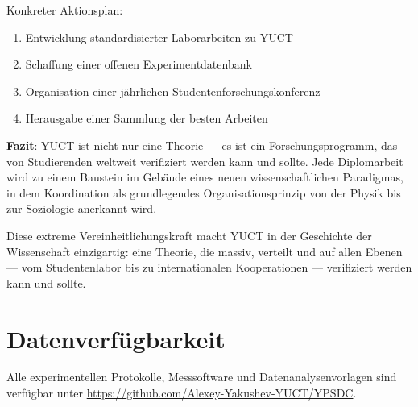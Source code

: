 \documentclass[12pt,a4paper]{article}
\begin{document}
	Konkreter Aktionsplan:
	\begin{enumerate}
		\item Entwicklung standardisierter Laborarbeiten zu YUCT
		\item Schaffung einer offenen Experimentdatenbank
		\item Organisation einer jährlichen Studentenforschungskonferenz
		\item Herausgabe einer Sammlung der besten Arbeiten
	\end{enumerate}
	
	\textbf{Fazit}: YUCT ist nicht nur eine Theorie — es ist ein Forschungsprogramm, das von Studierenden weltweit verifiziert werden kann und sollte. Jede Diplomarbeit wird zu einem Baustein im Gebäude eines neuen wissenschaftlichen Paradigmas, in dem Koordination als grundlegendes Organisationsprinzip von der Physik bis zur Soziologie anerkannt wird.
	
	Diese extreme Vereinheitlichungskraft macht YUCT in der Geschichte der Wissenschaft einzigartig: eine Theorie, die massiv, verteilt und auf allen Ebenen — vom Studentenlabor bis zu internationalen Kooperationen — verifiziert werden kann und sollte.
	
	\section*{Datenverfügbarkeit}
	Alle experimentellen Protokolle, Messsoftware und Datenanalysenvorlagen sind verfügbar unter \url{https://github.com/Alexey-Yakushev-YUCT/YPSDC}.
	
\end{document}
